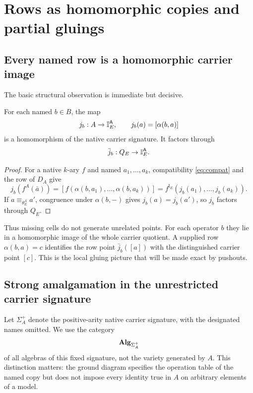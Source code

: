 \section{Rows as homomorphic copies and partial gluings}\label{sec:rows}

\subsection{Every named row is a homomorphic carrier image}

The basic structural observation is immediate but decisive.

\begin{proposition}\label{prop:rowhom}
For each named $b\in B$, the map
\[
j_b:A\to \mathbb I_E^{\mathsf{A}},
\qquad
j_b(a)=[\alpha(b,a)]
\]
is a homomorphism of the native carrier signature.  It factors through
\[
\bar j_b:Q_E\to \mathbb I_E^{\mathsf{A}}.
\]
\end{proposition}

\begin{proof}
For a native $k$-ary $f$ and named $a_1,\ldots,a_k$, compatibility \eqref{eq:compat} and the row of $D_A$ give
\[
j_b(f^A(\bar a))
=
[f(\alpha(b,a_1),\ldots,\alpha(b,a_k))]
=
f^{\mathbb I_E}(j_b(a_1),\ldots,j_b(a_k)).
\]
If $a\equiv_{\theta_E^A}a'$, congruence under $\alpha(b,-)$ gives $j_b(a)=j_b(a')$, so $j_b$ factors through $Q_E$.
\end{proof}

Thus missing cells do not generate unrelated points.  For each operator $b$ they lie in a homomorphic image of the whole carrier quotient.  A supplied row $\alpha(b,a)=c$ identifies the row point $\bar j_b([a])$ with the distinguished carrier point $[c]$.  This is the local gluing picture that will be made exact by pushouts.

\subsection{Strong amalgamation in the unrestricted carrier signature}

Let $\Sigma_A^+$ denote the positive-arity native carrier signature, with the designated names omitted.  We use the category
\[
\mathbf{Alg}_{\Sigma_A^+}
\]
of all algebras of this fixed signature, not the variety generated by $A$.  This distinction matters: the ground diagram specifies the operation table of the named copy but does not impose every identity true in $A$ on arbitrary elements of a model.

